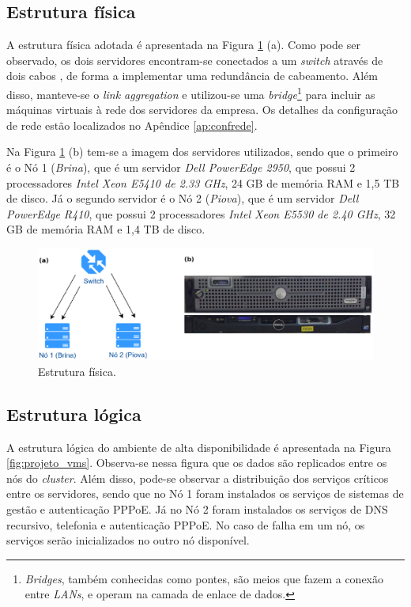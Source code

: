 \subsection{Estrutura física}

A estrutura física adotada é apresentada na Figura \ref{fig:projeto_fisico} (a). Como pode ser observado, os dois servidores encontram-se 
conectados a um \textit{switch} através de dois cabos , de forma a implementar uma redundância de cabeamento. Além disso, manteve-se o 
\textit{link aggregation} e utilizou-se uma \textit{bridge}\footnote[1]{\textit{Bridges}, também conhecidas como pontes, são meios que fazem a 
conexão entre \textit{LANs}, e operam na camada de enlace de dados.} para incluir as máquinas virtuais à rede dos servidores da empresa. 
Os detalhes da configuração de rede estão localizados no Apêndice \ref{ap:confrede}.

Na Figura \ref{fig:projeto_fisico} (b) tem-se a imagem dos servidores utilizados, sendo que o primeiro é o Nó 1 (\textit{Brina}), que é um servidor
\textit{Dell PowerEdge 2950}, que possui 2 processadores \textit{Intel Xeon E5410 de 2.33 GHz}, 24 GB de memória \ac{RAM} e 1,5 TB de disco. 
Já o segundo servidor é o Nó 2 (\textit{Piova}), que é um servidor \textit{Dell PowerEdge R410}, que possui 2 processadores 
\textit{Intel Xeon E5530 de 2.40 GHz}, 32 GB de memória \ac{RAM} e 1,4 TB de disco.

\begin{figure}[h!]
 \centering
 \includegraphics[width=430px]{img/projeto_fisico.eps}
 \caption{Estrutura física.}
 \label{fig:projeto_fisico}
\end{figure}

\subsection{Estrutura lógica}

A estrutura lógica do ambiente de alta disponibilidade é apresentada na Figura \ref{fig:projeto_vms}. Observa-se nessa figura que os dados são
replicados entre os nós do \textit{cluster}. Além disso, pode-se observar a distribuição dos serviços críticos entre os servidores, sendo que 
no Nó 1 foram instalados os serviços de sistemas de gestão e autenticação \ac{PPPoE}. Já no Nó 2 foram instalados os serviços de \ac{DNS} 
recursivo, telefonia e autenticação \ac{PPPoE}. No caso de falha em um nó, os serviços serão inicializados no outro nó disponível. 

